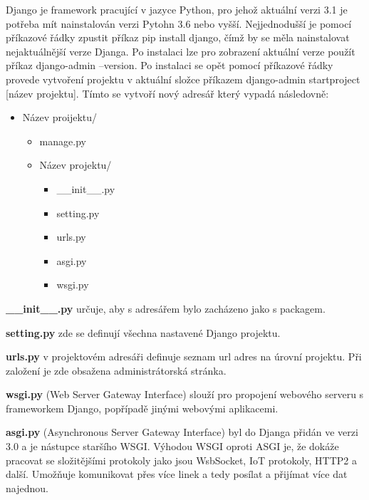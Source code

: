 Django je framework pracující v jazyce Python, pro jehož aktuální
verzi 3.1 je potřeba mít nainstalován verzi Pytohn 3.6 nebo
vyšší. Nejjednodušší je pomocí příkazové řádky zpustit příkaz pip
install django, čímž by se měla nainstalovat nejaktuálnější verze
Djanga. Po instalaci lze pro zobrazení aktuální verze použít příkaz
django-admin --version. Po instalaci se opět pomocí příkazové řádky
provede vytvoření projektu v aktuální složce příkazem django-admin
startproject [název projektu]. Tímto se vytvoří nový adresář který
vypadá následovně:

\begin{itemize}
	\item \lbrack Název proijektu\rbrack /
	\begin{itemize}
		\item manage.py
		\item \lbrack Název projektu\rbrack /
		\begin{itemize}
			\item \_\_init\_\_.py
			\item setting.py
			\item urls.py
			\item asgi.py
			\item wsgi.py
		\end{itemize}
	\end{itemize}
\end{itemize}

\vspace{6px}

\textbf{\_\_init\_\_.py} určuje, aby s adresářem bylo zacházeno jako s packagem.
\vspace{6px}

\textbf{setting.py} zde se definují všechna nastavené Django projektu. 
\vspace{6px}

\textbf{urls.py} v projektovém adresáři definuje seznam url adres na
úrovní projektu. Při založení je zde obsažena administrátorská
stránka.  \vspace{6px}

\textbf{wsgi.py} (Web Server Gateway Interface) slouží pro propojení
webového serveru s frameworkem Django, popřípadě jinými webovými
aplikacemi.  \vspace{6px}

\textbf{asgi.py} (Asynchronous Server Gateway Interface) byl do Djanga
přidán ve verzi 3.0 a je nástupce staršího WSGI. Výhodou WSGI oproti
ASGI je, že dokáže pracovat se složitějšími protokoly jako jsou
WsbSocket, IoT protokoly, HTTP2 a další. Umožňuje komunikovat přes
více linek a tedy posílat a přijímat více dat najednou.  \vspace{6px}

